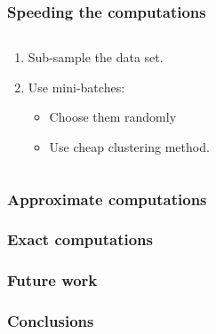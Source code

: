\documentclass{beamer}
\begin{document}
     \begin{frame}
      \frametitle{Speeding the computations}
      \begin{columns}
		\begin{column}{7cm}
			 \begin{enumerate}
			    \item Sub-sample the data set.
			    \item Use mini-batches:
				\begin{itemize}
				  \item Choose them randomly
				  \item Use cheap clustering method.
				\end{itemize}
			 \end{enumerate}
		\end{column}
		\begin{column}{5cm}

		\end{column}
	\end{columns}
   \end{frame}

  \begin{frame}
   \frametitle{Approximate computations}
  \end{frame}

  \begin{frame}
   \frametitle{Exact computations}
  \end{frame}

  \begin{frame}
      \frametitle{Future work}
   \end{frame}

  \begin{frame}
      \frametitle{Conclusions}
   \end{frame}

  
\end{document}
